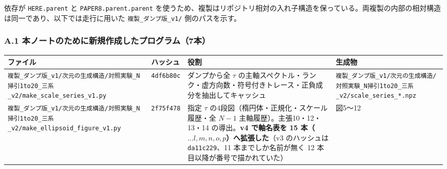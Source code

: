\documentclass[
  10pt,
]{ltjsarticle}
\newcounter{none} %
\begin{document}
依存が \texttt{HERE.parent} と \texttt{PAPER8.parent.parent}
を使うため、複製はリポジトリ相対の入れ子構造を保っている。両複製の内部の相対構造は同一であり、以下では走行に用いた
\texttt{複製\_ダンプ版\_v1/} 側のパスを示す。

\subsubsection{A.1
本ノートのために新規作成したプログラム（7本）}\label{a.1-ux672cux30ceux30fcux30c8ux306eux305fux3081ux306bux65b0ux898fux4f5cux6210ux3057ux305fux30d7ux30edux30b0ux30e9ux30e07ux672c}

{\def\LTcaptype{none} %
\begin{longtable}[]{@{}
  >{\raggedright\arraybackslash}p{}
  >{\raggedright\arraybackslash}p{}
  >{\raggedright\arraybackslash}p{}
  >{\raggedright\arraybackslash}p{}@{}}
\toprule\noalign{}
\begin{minipage}[b]{\linewidth}\raggedright
ファイル
\end{minipage} & \begin{minipage}[b]{\linewidth}\raggedright
ハッシュ
\end{minipage} & \begin{minipage}[b]{\linewidth}\raggedright
役割
\end{minipage} & \begin{minipage}[b]{\linewidth}\raggedright
生成物
\end{minipage} \\
\midrule\noalign{}
\endhead
\bottomrule\noalign{}
\endlastfoot
\texttt{複製\_ダンプ版\_v1/次元の生成構造/対照実験\_N掃引1to20\_三系\_v2/make\_scale\_series\_v1.py}
& \texttt{4df6b80c} & ダンプから全 \(\tau\)
の主軸スペクトル・ランク・虚方向数・符号付きトレース・正負成分を抽出してキャッシュ
&
\texttt{複製\_ダンプ版\_v1/次元の生成構造/対照実験\_N掃引1to20\_三系\_v2/scale\_series\_*.npz} \\
\texttt{複製\_ダンプ版\_v1/次元の生成構造/対照実験\_N掃引1to20\_三系\_v2/make\_ellipsoid\_figure\_v1.py}
& \texttt{2f75f478} & 指定 \(\tau\)
の4段図（楕円体・正規化・スケール履歴・全 \(N-1\)
主軸履歴）。主張10・12・13・14 の導出。\textbf{v4 で軸名表を 15
本（\(\dots l,m,n,o,p\)）へ拡張した}（v3 のハッシュは
\texttt{da11c229}、11 本までしか名前が無く 12
本目以降が番号で描かれていた） & 図5〜12 \\

\end{longtable}}
\end{document}
